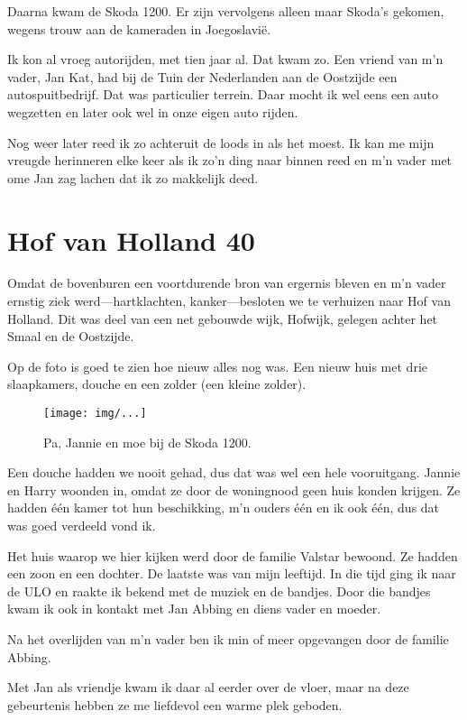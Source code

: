 \documentclass[10pt,twoside,openright]{memoir}
\begin{document}
Daarna kwam de Skoda 1200. Er zijn vervolgens alleen maar Skoda's gekomen, wegens trouw aan de kameraden in Joegoslavië. 

Ik kon al vroeg autorijden, met tien jaar al. Dat kwam zo. Een vriend van m'n vader, Jan Kat, had bij de Tuin der Nederlanden aan de Oostzijde een autospuitbedrijf. Dat was particulier terrein. Daar mocht ik wel eens een auto wegzetten en later ook wel in onze eigen auto rijden. 

Nog weer later reed ik zo achteruit de loods in als het moest. Ik kan me mijn vreugde herinneren elke keer als ik zo'n ding naar binnen reed en m'n vader met ome Jan zag lachen dat ik zo makkelijk deed.

\chapter{Hof van Holland 40} %
\label{cha:hofvanholland}

Omdat de bovenburen een voortdurende bron van ergernis bleven en m’n vader ernstig ziek werd---hartklachten, kanker---besloten we te verhuizen naar Hof van Holland. Dit was deel van een net gebouwde wijk, Hofwijk, gelegen achter het Smaal en de Oostzijde. 

Op de foto is goed te zien hoe nieuw alles nog was. Een nieuw huis met drie slaapkamers, douche en een zolder (een kleine zolder). 

\begin{figure}[t]
\texttt{[image: img/...]}
\caption{Pa, Jannie en moe bij de Skoda 1200.}
\end{figure}

Een douche hadden we nooit gehad, dus dat was wel een hele vooruitgang. Jannie en Harry woonden in, omdat ze door de woningnood geen huis konden krijgen. Ze hadden één kamer tot hun beschikking, m’n ouders één en ik ook één, dus dat was goed verdeeld vond ik. 

Het huis waarop we hier kijken werd door de familie Valstar bewoond. Ze hadden een zoon en een dochter. De laatste was van mijn leeftijd. In die tijd ging ik naar de ULO en raakte ik bekend met de muziek en de bandjes. Door die bandjes kwam ik ook in kontakt met Jan Abbing en diens vader en moeder. 

Na het overlijden van m’n vader ben ik min of meer opgevangen door de familie Abbing. 

Met Jan als vriendje kwam ik daar al eerder over de vloer, maar na deze gebeurtenis hebben ze me liefdevol een warme plek geboden.
\end{document}
